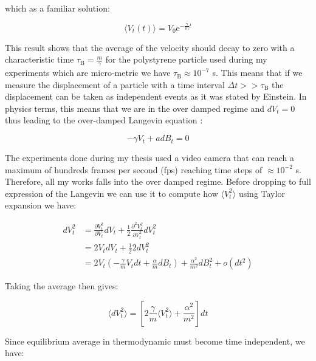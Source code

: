 which as a familiar solution:

\begin{equation}
	\langle V_t (t) \rangle =   V_0 \mathrm{e}^{-\frac{\gamma}{m} t}
	\label{Eq.int_V_langevin}
\end{equation}

This result shows that the average of the velocity should decay to zero with a characteristic time $\tau _\mathrm{B} = \frac{m}{\gamma}$ for the polystyrene  particle used during my experiments which are micro-metric we have $\tau_\mathrm{B} \approx 10^{-7}$ s. This means that if we measure the displacement of a particle with a time interval $ \Delta t  >> \tau _\mathrm{B} $ the displacement can be taken as independent events as it was stated by Einstein. In physics terms, this means that we are in the over damped regime and $dV_t = 0$ thus leading to the over-damped Langevin equation :

\begin{equation}
	-\gamma V_t  + adB_t = 0
\end{equation}

The experiments done during my thesis used a video camera that can reach a maximum of hundreds frames per second (\gls{fps}) reaching time steps of $\approx 10^{-2}$ s. Therefore, all my works falls into the over damped regime. Before dropping to full expression of the Langevin we can use it to compute how $\langle V_t ^2 \rangle$ using Taylor expansion we have:

\begin{equation}
	\begin{aligned}
	dV_t^2 &= \frac{\partial V_t ^ 2}{\partial V_t} d V_t + \frac{1}{2} \frac{\partial ^2 V_t^2}{\partial V_t ^2} dV_t^2  \\
	& = 2 V_t dV_t + \frac{1}{2} 2dV_t^2 \\
	& = 2V_t\left( -\frac{\gamma}{m}V_tdt + \frac{\alpha}{m}dB_t  \right) + \frac{\alpha^2}{m^2}dB_t ^2 + o(dt^2)
	\end{aligned}
\end{equation}

Taking the average then gives:

\begin{equation}
	\langle dV_t^2 \rangle = \left[2 \frac{\gamma}{m} \langle V_t ^2 \rangle + \frac{\alpha^2}{m^2}\right]dt
\end{equation}

Since equilibrium average in thermodynamic must become time independent, we have:

